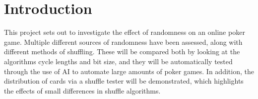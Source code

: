 \section{Introduction}
This project sets out to investigate the effect of randomness on an online
poker game. Multiple different sources of randomness have been assessed, along
with different methods of shuffling. These will be compared both by looking
at the algorithms cycle lengths and bit size, and they will be automatically
tested through the use of AI to automate large amounts of poker games.
In addition, the distribution of cards via a shuffle tester will be
demonstrated, which highlights the effects of small differences in shuffle
algorithms.

